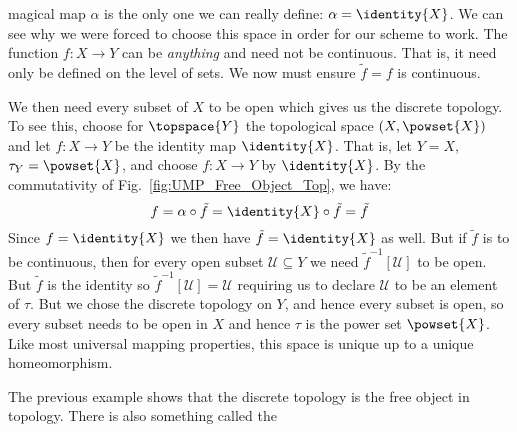\documentclass{book}                                                           %
\begin{document}
\begin{example}
\begin{minipage}[b]{0.588\textwidth}
                        magical map $\alpha$ is the only one we can really
                        define: $\alpha=\identity{X}$. We can see why we were
                        forced to choose this space in order for our scheme to
                        work. The function $f:X\rightarrow{Y}$ can be
                        \textit{anything} and need not be continuous. That is,
                        it need only be defined on the level of sets. We now
                        must ensure $\tilde{f}=f$ is continuous.
                    \end{minipage}
                    \par\vspace{2.5ex}
                    We then need every subset of $X$ to be open which
                    gives us the discrete topology. To see this, choose for
                    $\topspace{Y}$ the topological space $(X,\powset{X})$
                    and let $f:X\rightarrow{Y}$ be the identity map $\identity{X}$.
                    That is, let $Y=X$, $\tau_{Y}=\powset{X}$, and choose
                    $f:X\rightarrow{Y}$ by $\identity{X}$. By the commutativity
                    of Fig.~\ref{fig:UMP_Free_Object_Top}, we have:
                    \begin{equation}
                        f=\alpha\circ\tilde{f}
                            =\identity{X}\circ\tilde{f}
                            =\tilde{f}
                    \end{equation}
                    Since $f=\identity{X}$ we then have $\tilde{f}=\identity{X}$
                    as well. But if $\tilde{f}$ is to be continuous, then for
                    every open subset $\mathcal{U}\subseteq{Y}$ we need
                    $\tilde{f}^{\minus{1}}[\mathcal{U}]$ to be open. But
                    $\tilde{f}$ is the identity so
                    $\tilde{f}^{\minus{1}}[\mathcal{U}]=\mathcal{U}$ requiring
                    us to declare $\mathcal{U}$ to be an element of $\tau$. But
                    we chose the discrete topology on $Y$, and hence every
                    subset is open, so every subset needs to be open in $X$ and
                    hence $\tau$ is the power set $\powset{X}$. Like most
                    universal mapping properties, this space is unique up to a
                    unique homeomorphism.
                \end{example}
                The previous example shows that the discrete topology is the
                free object in topology. There is also something called the
\end{document}
